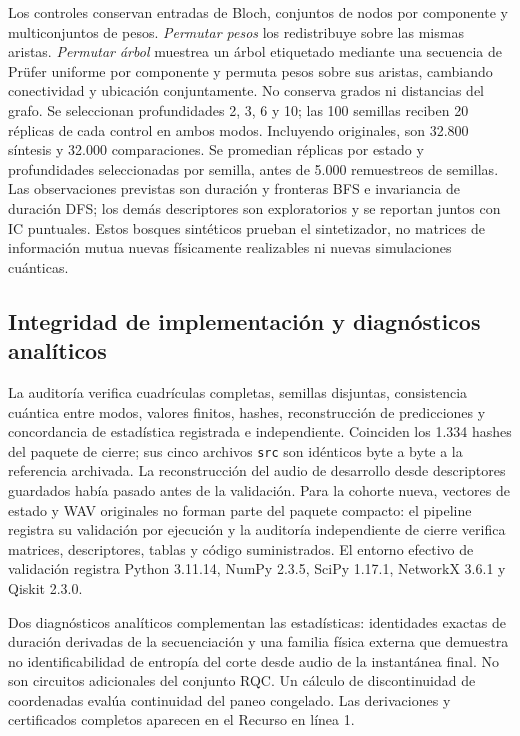\documentclass[pdflatex,iicol,sn-basic,Numbered]{sn-jnl}
\begin{document}
Los controles conservan entradas de Bloch, conjuntos de nodos por componente y multiconjuntos de pesos. \emph{Permutar pesos} los redistribuye sobre las mismas aristas. \emph{Permutar árbol} muestrea un árbol etiquetado mediante una secuencia de Pr\"ufer uniforme por componente y permuta pesos sobre sus aristas, cambiando conectividad y ubicación conjuntamente. No conserva grados ni distancias del grafo. Se seleccionan profundidades 2, 3, 6 y 10; las 100 semillas reciben 20 réplicas de cada control en ambos modos. Incluyendo originales, son 32.800 síntesis y 32.000 comparaciones. Se promedian réplicas por estado y profundidades seleccionadas por semilla, antes de 5.000 remuestreos de semillas. Las observaciones previstas son duración y fronteras BFS e invariancia de duración DFS; los demás descriptores son exploratorios y se reportan juntos con IC puntuales. Estos bosques sintéticos prueban el sintetizador, no matrices de información mutua nuevas físicamente realizables ni nuevas simulaciones cuánticas.

\subsection{Integridad de implementación y diagnósticos analíticos}
La auditoría verifica cuadrículas completas, semillas disjuntas, consistencia cuántica entre modos, valores finitos, hashes, reconstrucción de predicciones y concordancia de estadística registrada e independiente. Coinciden los 1.334 hashes del paquete de cierre; sus cinco archivos \texttt{src} son idénticos byte a byte a la referencia archivada. La reconstrucción del audio de desarrollo desde descriptores guardados había pasado antes de la validación. Para la cohorte nueva, vectores de estado y WAV originales no forman parte del paquete compacto: el pipeline registra su validación por ejecución y la auditoría independiente de cierre verifica matrices, descriptores, tablas y código suministrados. El entorno efectivo de validación registra Python 3.11.14, NumPy 2.3.5, SciPy 1.17.1, NetworkX 3.6.1 y Qiskit 2.3.0.

Dos diagnósticos analíticos complementan las estadísticas: identidades exactas de duración derivadas de la secuenciación y una familia física externa que demuestra no identificabilidad de entropía del corte desde audio de la instantánea final. No son circuitos adicionales del conjunto RQC. Un cálculo de discontinuidad de coordenadas evalúa continuidad del paneo congelado. Las derivaciones y certificados completos aparecen en el Recurso en línea 1.
\end{document}
